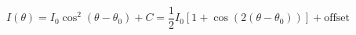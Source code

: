\begin{equation}
\label{eq:Malus}
I(\theta) = I_0 \cos^2(\theta - {\theta}_0)+ C = \frac{1}{2}I_0\left[1 + \cos(2 (\theta - \theta_0))\right]+ \textrm{offset}
\end{equation}